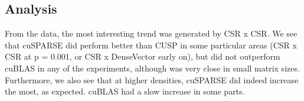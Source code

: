 \documentclass[12pt]{article}
\begin{document}

\subsection{Analysis}
From the data, the most interesting trend was generated by CSR x CSR. We see that cuSPARSE did perform better than CUSP in some particular areas (CSR x CSR at p = 0.001, or CSR x DenseVector early on), but did not outperform cuBLAS in any of the experiments, although was very close in small matrix sizes. Furthermore, we also see that at higher densities, cuSPARSE did indeed increase the most, as expected. cuBLAS had a slow increase in some parts. 
\end{document}
